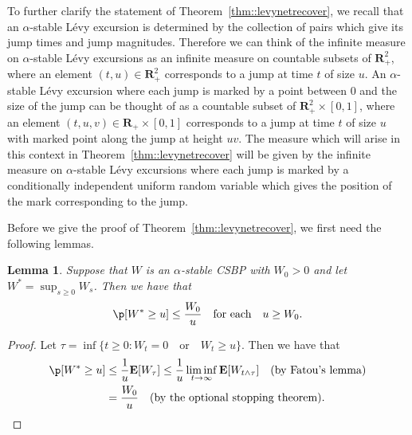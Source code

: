 \documentclass[10pt]{amsart}
\theoremstyle{plain}
\numberwithin{theorem}{section}
\newtheorem{lemma}[theorem]{Lemma}
\theoremstyle{definition}
\newcommand \E {{\mathbf E}}
\newcommand{\R}{\mathbf{R}}
\begin{document}
To further clarify the statement of Theorem~\ref{thm::levynetrecover}, we recall that an $\alpha$-stable Lévy excursion is determined by the collection of pairs which give its jump times and jump magnitudes. Therefore we can think of the infinite measure on $\alpha$-stable Lévy excursions as an infinite measure on countable subsets of $\R_+^2$, where an element $(t,u) \in \R_+^2$ corresponds to a jump at time $t$ of size $u$. An $\alpha$-stable Lévy excursion where each jump is marked by a point between $0$ and the size of the jump can be thought of as a countable subset of $\R_+^2 \times [0,1]$, where an element $(t,u,v) \in \R_+ \times [0,1]$ corresponds to a jump at time $t$ of size $u$ with marked point along the jump at height $uv$. The measure which will arise in this context in Theorem~\ref{thm::levynetrecover} will be given by the infinite measure on $\alpha$-stable Lévy excursions where each jump is marked by a conditionally independent uniform random variable which gives the position of the mark corresponding to the jump.

Before we give the proof of Theorem~\ref{thm::levynetrecover}, we first need the following lemmas.

\begin{lemma}
\label{lem::csbp_sup}
Suppose that $W$ is an $\alpha$-stable CSBP with $W_0 > 0$ and let $W^* = \sup_{s \geq 0} W_s$. Then we have that
\begin{equation}
\label{eqn::csbp_sup_bound}
\p[ W^* \geq u] \leq \frac{W_0}{u} \quad\text{for each}\quad u \geq W_0.
\end{equation}
\end{lemma}
\begin{proof}
Let $\tau = \inf\{t \geq 0: W_t = 0 \quad\text{or}\quad W_t \geq u\}$. Then we have that
\begin{align*}
\p[ W^* \geq u ]
&\leq \frac{1}{u} \E[ W_\tau ] \leq \frac{1}{u} \liminf_{t \to \infty} \E[ W_{t \wedge \tau}] \quad\text{(by Fatou's lemma)}\\
&= \frac{W_0}{u} \quad\text{(by the optional stopping theorem)}.\qedhere	
\end{align*}
\end{proof}
\end{document}
